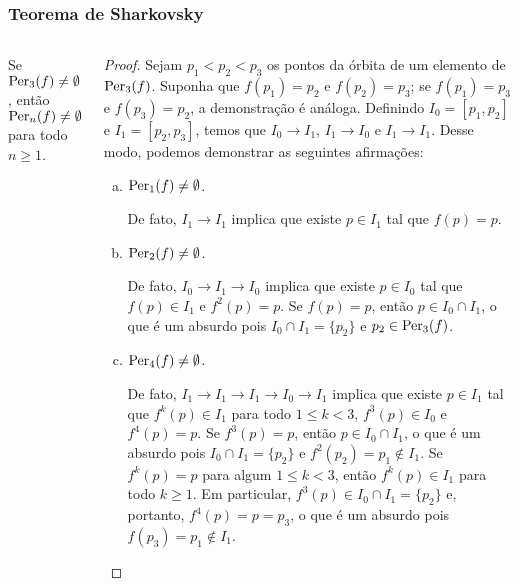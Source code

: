 \begin{frame}
\vspace{5pt}
\frametitle{Teorema de Sharkovsky}
\begin{columns}
\column{\dimexpr\paperwidth-15pt}

\begin{theorem}\label{teo 9-2}
Se $\operatorname{Per}_3(f) \neq \emptyset$, então $\operatorname{Per}_n(f) \neq \emptyset$ para todo $n \geq 1$.
\end{theorem}

\begin{proof}
Sejam $p_1 < p_2 < p_3$ os pontos da órbita de um elemento de $\operatorname{Per}_3(f)$. Suponha que $f(p_1) = p_2$ e $f(p_2) = p_3$; se $f(p_1) = p_3$ e $f(p_3) = p_2$, a demonstração é análoga.
Definindo $I_0 = [p_1, p_2]$ e $I_1 = [p_2, p_3]$, temos que $I_0 \longrightarrow I_1$, $I_1 \longrightarrow I_0$ e $I_1 \longrightarrow I_1$. Desse modo, podemos demonstrar as seguintes afirmações:

\begin{enumerate}[a)]
\item \textit{$\operatorname{Per}_1(f) \neq \emptyset$.}

De fato, $I_1 \longrightarrow I_1$ implica que existe $p \in I_1$ tal que $f(p) = p$.

\item \textit{$\operatorname{Per}_2(f) \neq \emptyset$.}

De fato, $I_0 \longrightarrow I_1 \longrightarrow I_0$ implica que existe $p \in I_0$ tal que $f(p) \in I_1$ e $f^2(p) = p$.
Se $f(p) = p$, então $p \in I_0 \cap I_1$, o que é um absurdo pois $I_0 \cap I_1 = \lbrace p_2 \rbrace$ e $p_2 \in \operatorname{Per}_3(f)$.

\item \textit{$\operatorname{Per}_4(f) \neq \emptyset$.}

De fato, $I_1 \longrightarrow I_1 \longrightarrow I_1 \longrightarrow I_0 \longrightarrow I_1$ implica que existe $p \in I_1$ tal que $f^k(p) \in I_1$ para todo $1 \leq k < 3$, $f^3(p) \in I_0$ e $f^4(p) = p$.
Se $f^3(p) = p$, então $p \in I_0 \cap I_1$, o que é um absurdo pois $I_0 \cap I_1 = \lbrace p_2 \rbrace$ e $f^2(p_2) = p_1 \notin I_1$.
Se $f^k(p) = p$ para algum $1 \leq k < 3$, então $f^k(p) \in I_1$ para todo $k \geq 1$.
Em particular, $f^3(p) \in I_0 \cap I_1 = \lbrace p_2 \rbrace$ e, portanto, $f^4(p) = p = p_3$, o que é um absurdo pois $f(p_3) = p_1 \notin I_1$.
\end{enumerate}
\end{proof}

\end{columns}
\end{frame}

